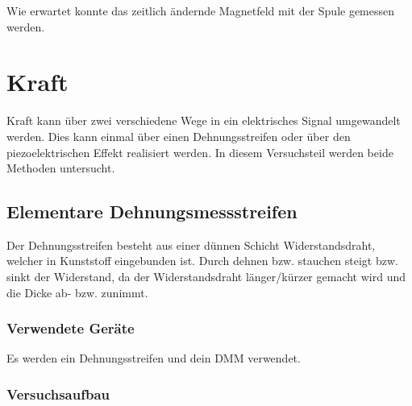 \documentclass[12pt,a4paper]{article}
\begin{document}
Wie erwartet konnte das zeitlich ändernde Magnetfeld mit der Spule gemessen werden.




\section{Kraft}

Kraft kann über zwei verschiedene Wege in ein elektrisches Signal umgewandelt werden. Dies kann einmal über einen Dehnungsstreifen oder über den piezoelektrischen Effekt realisiert werden. In diesem Versuchsteil werden beide Methoden untersucht.

\subsection{Elementare Dehnungsmessstreifen}

Der Dehnungsstreifen besteht aus einer dünnen Schicht Widerstandsdraht, welcher in Kunststoff eingebunden ist. Durch dehnen bzw. stauchen steigt bzw. sinkt der Widerstand, da der Widerstandsdraht länger/kürzer gemacht wird und die Dicke ab- bzw. zunimmt.

\subsubsection*{Verwendete Geräte}

Es werden ein Dehnungsstreifen und dein DMM verwendet.


\subsubsection*{Versuchsaufbau}
\end{document}
